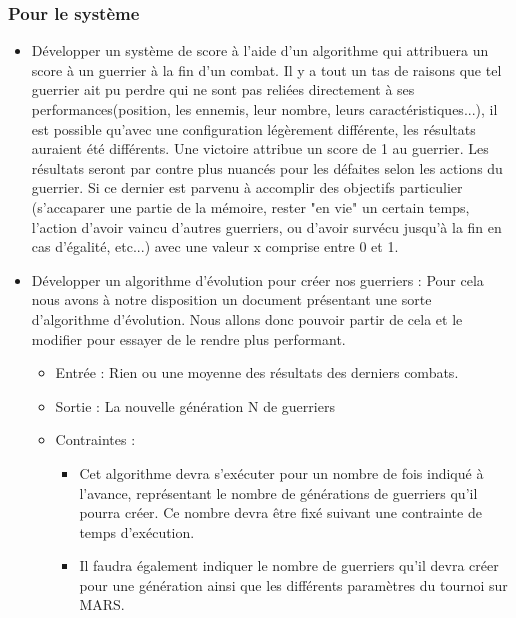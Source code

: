 \documentclass{article}
\begin{document}
        \subsubsection{Pour le système}
            \begin{itemize}
                \item Développer un système de score à l'aide d'un algorithme qui attribuera un score à un guerrier à la fin d'un combat. Il y a tout un tas de raisons que tel guerrier ait pu perdre qui ne sont pas reliées directement à ses performances(position, les ennemis, leur nombre, leurs caractéristiques...), il est possible qu'avec une configuration légèrement différente, les résultats auraient été différents. Une victoire attribue un score de 1 au guerrier. Les résultats seront par contre plus nuancés pour les défaites selon les actions du guerrier. Si ce dernier est parvenu à accomplir des objectifs particulier (s'accaparer une partie de la mémoire, rester "en vie" un certain temps, l'action d'avoir vaincu d'autres guerriers, ou d'avoir survécu jusqu'à la fin en cas d'égalité, etc...) avec une valeur x comprise entre 0 et 1.
                \item Développer un algorithme d’évolution pour créer nos guerriers : Pour cela nous avons à notre disposition un document présentant une sorte d'algorithme d'évolution. Nous allons donc pouvoir partir de cela et le modifier pour essayer de le rendre plus performant.
                \begin{itemize}
                    \item Entrée : Rien ou une moyenne des résultats des derniers combats.
                    \item Sortie : La nouvelle génération N de guerriers
                    \item Contraintes :  
                        \begin{itemize}
                            \item Cet algorithme devra s'exécuter pour un nombre de fois indiqué à l'avance, représentant le nombre de générations de guerriers qu'il pourra créer. Ce nombre devra être fixé suivant une contrainte de temps d'exécution.
                            \item Il faudra également indiquer le nombre de guerriers qu'il devra créer pour une génération ainsi que les différents paramètres du tournoi sur MARS.
                        \end{itemize}
                \end{itemize}

\end{itemize}
\end{document}
